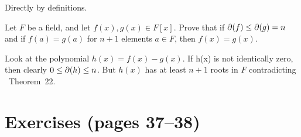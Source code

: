 \begin{myenumerate}
Directly by definitions.


\item
\begin{excopy}
Let $F$ be a field, and let \(f(x),g(x)\in F[x]\).
Prove that if \(\partial(f)\leq\partial(g)=n\)
and if \(f(a)=g(a)\) for \(n+1\) elements \(a\in F\), then \(f(x)=g(x)\).
\end{excopy}

Look at the polynomial \(h(x)=f(x)-g(x)\).
If h(x) is not identically zero, then clearly
\(0\leq \partial(h)\leq n\). But \(h(x)\) has at least \(n+1\) roots in $F$
contradicting \cite{Rotman98}~Theorem~22.

\end{myenumerate}



\section{Exercises (pages 37--38)}

